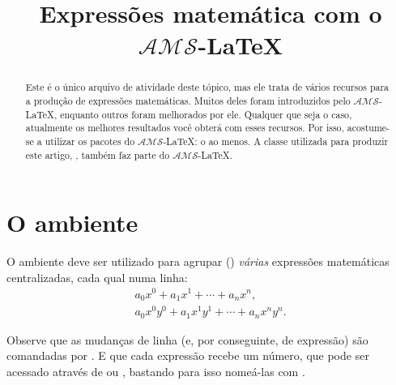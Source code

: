 \documentclass[a4paper,12pt]{amsart}
\newcommand{\amslatex}{$\mathcal {AMS}$-\LaTeX\xspace}
\begin{document}
	\newsavebox{\authorbox}

	\title{Expressões matemática com o \amslatex}
	\author{\usebox{\authorbox}}
	
	\begin{abstract}
	Este é o único arquivo de atividade deste tópico, mas ele trata de vários recursos para a produção de expressões matemáticas. Muitos deles foram introduzidos pelo \amslatex, enquanto outros foram melhorados por ele. Qualquer que seja o caso, atualmente os melhores resultados você obterá com esses recursos. Por isso, acostume-se a utilizar os pacotes do \amslatex: o  ao menos. A classe utilizada para produzir este artigo, , também faz parte do \amslatex.
	\end{abstract}
	
	\maketitle
	
	\section{O ambiente }
		\label{sec:gather}
	
	O ambiente  deve ser utilizado para agrupar () \emph{várias} expressões matemáticas centralizadas, cada qual numa linha:
	\begin{gather}
		a_0 x^0 + a_1 x^1 + \cdots + a_n x^n \text{,} \label{ax}\\
		a_0 x^0 y^0 + a_1 x^1 y^1 + \cdots + a_n x^n y^n \text{.} \label{axy}
	\end{gather}
	
	Observe que as mudanças de linha (e, por conseguinte, de expressão) são comandadas por \cs{\textbackslash}. E que cada expressão recebe um número, que pode ser acessado através de  ou , bastando para isso nomeá-las com .
	
\end{document}
